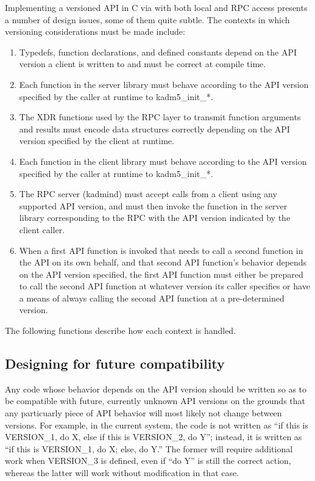 Implementing a versioned API in C via with both local and RPC access
presents a number of design issues, some of them quite subtle.  The
contexts in which versioning considerations must be made include:

\begin{enumerate}
\item Typedefs, function declarations, and defined constants depend on
the API version a client is written to and must be correct at compile
time.

\item Each function in the server library must behave according to the
API version specified by the caller at runtime to kadm5_init_*.

\item The XDR functions used by the RPC layer to transmit function
arguments and results must encode data structures correctly depending
on the API version specified by the client at runtime.

\item Each function in the client library must behave according to the
API version specified by the caller at runtime to kadm5_init_*.

\item The RPC server (kadmind) must accept calls from a client using
any supported API version, and must then invoke the function in the
server library corresponding to the RPC with the API version indicated
by the client caller.

\item When a first API function is invoked that needs to call a second
function in the API on its own behalf, and that second API function's
behavior depends on the API version specified, the first API function
must either be prepared to call the second API function at whatever
version its caller specifies or have a means of always calling the
second API function at a pre-determined version.
\end{enumerate}

The following functions describe how each context is handled.

\subsection{Designing for future compatibility}

Any code whose behavior depends on the API version should be written
so as to be compatible with future, currently unknown API versions on
the grounds that any particuarly piece of API behavior will most
likely not change between versions.  For example, in the current
system, the code is not written as ``if this is VERSION_1, do X, else
if this is VERSION_2, do Y''; instead, it is written as ``if this is
VERSION_1, do X; else, do Y.''  The former will require additional
work when VERSION_3 is defined, even if ``do Y'' is still the correct
action, whereas the latter will work without modification in that
case.


